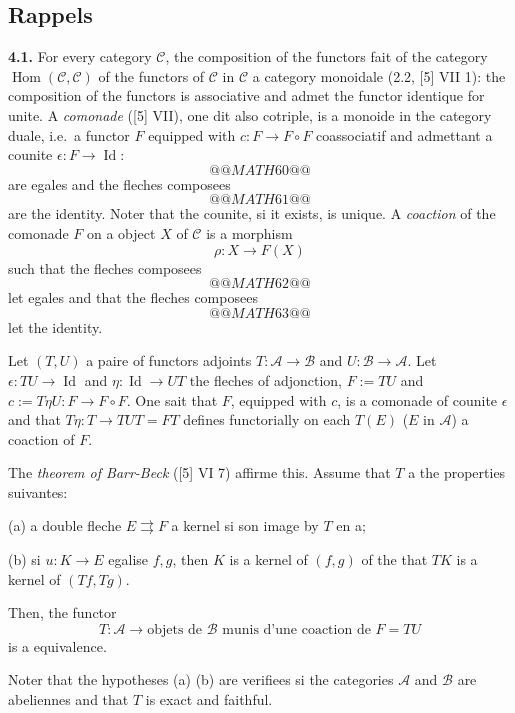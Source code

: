 \documentclass[12pt,a4paper]{article}
\theoremstyle{plain}
\theoremstyle{definition}
\theoremstyle{remark}
\DeclareMathOperator{\Hom}{Hom}
\DeclareMathOperator{\Id}{Id}
\begin{document}
\subsection{Rappels}

\textbf{4.1.} For every category $\mathcal{C}$, the composition of the functors fait of the category $\Hom(\mathcal{C},\mathcal{C})$ of the functors of $\mathcal{C}$ in $\mathcal{C}$ a category monoidale (2.2, [5] VII 1): the composition of the functors is associative and admet the functor identique for unite. A \emph{comonade} ([5] VII), one dit also cotriple, is a monoide in the category duale, i.e.~a functor $F$ equipped with $c : F \to F \circ F$ coassociatif and admettant a counite $\epsilon : F \to \Id$:
\[
@@MATH60@@
\]
are egales and the fleches composees
\[
@@MATH61@@
\]
are the identity. Noter that the counite, si it exists, is unique. A \emph{coaction} of the comonade $F$ on a object $X$ of $\mathcal{C}$ is a morphism
\[
\rho : X \to F(X)
\]
such that the fleches composees
\[
@@MATH62@@
\]
let egales and that the fleches composees
\[
@@MATH63@@
\]
let the identity.

Let $(T,U)$ a paire of functors adjoints $T : \mathcal{A} \to \mathcal{B}$ and $U : \mathcal{B} \to \mathcal{A}$. Let $\epsilon : TU \to \Id$ and $\eta : \Id \to UT$ the fleches of adjonction, $F := TU$ and $c := T\eta U : F \to F \circ F$. One sait that $F$, equipped with $c$, is a comonade of counite $\epsilon$ and that $T\eta : T \to TUT = FT$ defines functorially on each $T(E)$ ($E$ in $\mathcal{A}$) a coaction of $F$.

The \emph{theorem of Barr-Beck} ([5] VI 7) affirme this. Assume that $T$ a the properties suivantes:

(a) a double fleche $E \rightrightarrows F$ a kernel si son image by $T$ en a;

(b) si $u : K \to E$ egalise $f,g$, then $K$ is a kernel of $(f,g)$ of the that $TK$ is a kernel of $(Tf,Tg)$.

Then, the functor
\[
T : \mathcal{A} \longrightarrow \text{objets de $\mathcal{B}$ munis d'une coaction de $F = TU$}
\]
is a equivalence.

Noter that the hypotheses (a) (b) are verifiees si the categories $\mathcal{A}$ and $\mathcal{B}$ are abeliennes and that $T$ is exact and faithful.

\subsection{}
\end{document}

